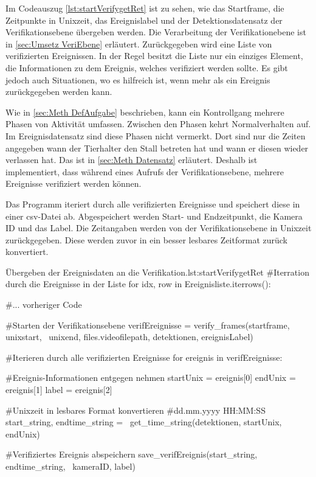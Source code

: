Im Codeauszug \ref{lst:startVerifygetRet} ist zu sehen, wie das Startframe, die Zeitpunkte in Unixzeit, das Ereignislabel und der Detektionsdatensatz der Verifikationsebene übergeben werden. Die Verarbeitung der Verifikationebene ist in \autoref{sec:Umsetz VeriEbene} erläutert. Zurückgegeben wird eine Liste von verifizierten Ereignissen. In der Regel besitzt die Liste nur ein einziges Element, die Informationen zu dem Ereignis, welches verifiziert werden sollte. Es gibt jedoch auch Situationen, wo es hilfreich ist, wenn mehr als ein Ereignis zurückgegeben werden kann. \par

Wie in \autoref{sec:Meth DefAufgabe} beschrieben, kann ein Kontrollgang mehrere Phasen von Aktivität umfassen. Zwischen den Phasen kehrt Normalverhalten auf. Im Ereignisdatensatz sind diese Phasen nicht vermerkt. Dort sind nur die Zeiten angegeben wann der Tierhalter den Stall betreten hat und wann er diesen wieder verlassen hat. Das ist in \autoref{sec:Meth Datensatz} erläutert. Deshalb ist implementiert, dass während eines Aufrufs der Verifikationsebene, mehrere Ereignisse verifiziert werden können. \par

Das Programm iteriert durch alle verifizierten Ereignisse und speichert diese in einer csv-Datei ab. Abgespeichert werden Start- und Endzeitpunkt, die Kamera ID und das Label. Die Zeitangaben werden von der Verifikationsebene in Unixzeit zurückgegeben. Diese werden zuvor in ein besser lesbares Zeitformat zurück konvertiert. 

\begin{pythoncode}{Übergeben der Ereignisdaten an die Verifikation.}{lst:startVerifygetRet}
#Iterration durch die Ereignisse in der Liste
for idx, row in Ereignisliste.iterrows():  

    #... vorheriger Code

    #Starten der Verifikationsebene
    verifEreignisse = verify_frames(startframe, unixstart, \ 
        unixend, files.videofilepath, detektionen, ereignisLabel)

    #Iterieren durch alle verifizierten Ereignisse 
    for ereignis in verifEreignisse:  

        #Ereignis-Informationen entgegen nehmen        
        startUnix = ereignis[0]      
        endUnix = ereignis[1]
        label = ereignis[2]

        #Unixzeit in lesbares Format konvertieren
        #dd.mm.yyyy HH:MM:SS 
        start_string, endtime_string = \ 
            get_time_string(detektionen, startUnix, endUnix)

        #Verifiziertes Ereignis abspeichern 
        save_verifEreignis(start_string, endtime_string, \ 
            kameraID, label)
\end{pythoncode}

